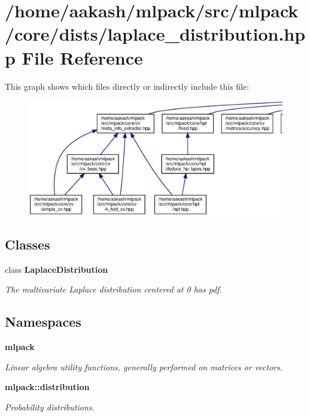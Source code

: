 \section{/home/aakash/mlpack/src/mlpack/core/dists/laplace\+\_\+distribution.hpp File Reference}
\label{laplace__distribution_8hpp}
This graph shows which files directly or indirectly include this file\+:
\nopagebreak
\begin{figure}[H]
\begin{center}
\leavevmode
\includegraphics[width=350pt]{laplace__distribution_8hpp__dep__incl}
\end{center}
\end{figure}
\subsection*{Classes}
\begin{DoxyCompactItemize}
\item 
class \textbf{ Laplace\+Distribution}
\begin{DoxyCompactList}\small\item\em The multivariate Laplace distribution centered at 0 has pdf. \end{DoxyCompactList}\end{DoxyCompactItemize}
\subsection*{Namespaces}
\begin{DoxyCompactItemize}
\item 
 \textbf{ mlpack}
\begin{DoxyCompactList}\small\item\em Linear algebra utility functions, generally performed on matrices or vectors. \end{DoxyCompactList}\item 
 \textbf{ mlpack\+::distribution}
\begin{DoxyCompactList}\small\item\em Probability distributions. \end{DoxyCompactList}\end{DoxyCompactItemize}
